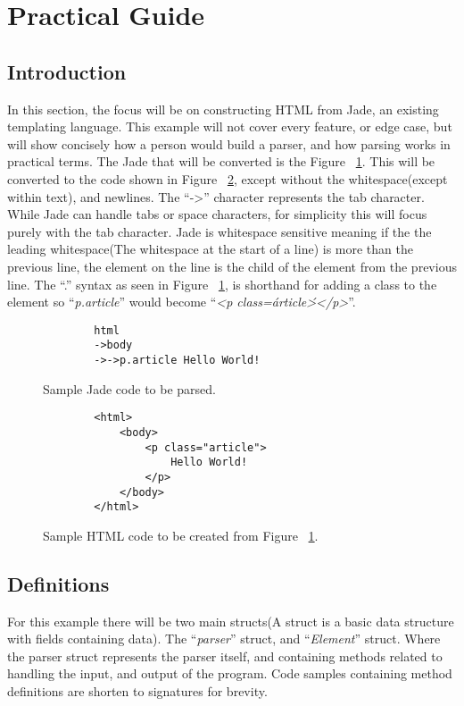 \section{Practical Guide}

\subsection{Introduction}
In this section, the focus will be on constructing HTML from Jade, an existing templating language. This example will not cover every feature, or edge case, but will show concisely how a person would build a parser, and how parsing works in practical terms. The Jade that will be converted is the Figure ~\ref{fig:jade}. This will be converted to the code shown in Figure ~\ref{fig:html}, except without the whitespace(except within text), and newlines. The ``->'' character represents the tab character. While Jade can handle tabs or space characters, for simplicity this will focus purely with the tab character. Jade is whitespace sensitive meaning if the the leading whitespace(The whitespace at the start of a line) is more than the previous line, the element on the line is the child of the element from the previous line. The ``.'' syntax as seen in Figure ~\ref{fig:jade}, is shorthand for adding a class to the element so ``\textit{p.article}'' would become ``\textit{<p class=\'article\'></p>}''.

\begin{figure}[ht!]
    \begin{verbatim}
        html
        ->body
        ->->p.article Hello World!
    \end{verbatim}
    \caption{Sample Jade code to be parsed.}
    \label{fig:jade}
\end{figure}

\begin{figure}[ht!]
    \begin{verbatim}
        <html>
            <body>
                <p class="article">
                    Hello World!
                </p>
            </body>
        </html>
    \end{verbatim}
    \caption{Sample HTML code to be created from Figure ~\ref{fig:jade}.}
    \label{fig:html}
\end{figure}

\subsection{Definitions}
For this example there will be two main structs(A struct is a basic data structure with fields containing data). The ``\textit{parser}'' struct, and ``\textit{Element}'' struct. Where the parser struct represents the parser itself, and containing methods related to handling the input, and output of the program. Code samples containing method definitions are shorten to signatures for brevity.

